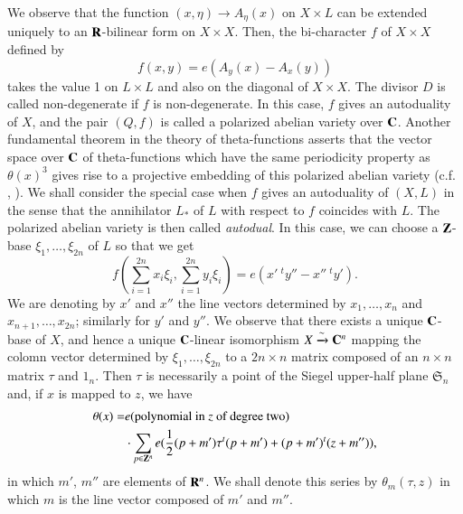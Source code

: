 We observe that the function $(x,\eta)\to A_{\eta}(x)$ on $X\times L$ can be extended uniquely to an $\mathbf{R}$-bilinear form on $X\times X$. Then, the bi-character $f$ of $X\times X$ defined by
$$
f(x,y)=e(A_{y}(x)-A_{x}(y))
$$\pageoriginale
takes the value 1 on $L\times L$ and also on the diagonal of $X\times X$. The divisor $D$ is called non-degenerate if $f$ is non-degenerate. In this case, $f$ gives an autoduality of $X$, and the pair $(Q,f)$ is called a polarized abelian variety over $\mathbf{C}$. Another fundamental theorem in the theory of theta-functions asserts that the vector space over $\mathbf{C}$ of theta-functions which have the same periodicity property as $\theta(x)^{3}$ gives rise to a projective embedding of this polarized abelian variety (c.f. \cite{art12-key23}, \cite{art12-key24}). We shall consider the special case when $f$ gives an autoduality of $(X,L)$ in the sense that the annihilator $L_{*}$ of $L$ with respect to $f$ coincides with $L$. The polarized abelian variety is then called {\em autodual}. In this case, we can choose a $\mathbf{Z}$-base $\xi_{1},\ldots,\xi_{2n}$  of $L$ so that we get
$$
f\left(\sum\limits^{2n}_{i=1}x_{i}\xi_{i},\sum\limits^{2n}_{i=1}y_{i}\xi_{i}\right)=e(x'\ {}^{t}y''-x'' \ {}^{t}y').
$$
We are denoting by $x'$ and $x''$ the line vectors determined by $x_{1},\ldots,x_{n}$ and $x_{n+1},\ldots,x_{2n}$; similarly for $y'$ and $y''$. We observe that there exists a unique $\mathbf{C}$-base of $X$, and hence a unique $\mathbf{C}$-linear isomorphism $X\xrightarrow{\sim}\mathbf{C}^{n}$ mapping the colomn vector determined by $\xi_{1},\ldots,\xi_{2n}$ to a $2n\times n$ matrix composed of an $n\times n$ matrix $\tau$ and $1_{n}$. Then $\tau$ is necessarily a point of the Siegel upper-half plane $\mathfrak{S}_{n}$ and, if $x$ is mapped to $z$, we have
\begin{align*}
\theta(x)= & e(\text{polynomial in $z$ of degree two})\\
           & \cdot \sum\limits_{p\in \mathbf{Z}^{n}}e(\frac{1}{2}(p+m')\tau^{t}(p+m')+(p+m')^{t}(z+m'')),
\end{align*}
in which $m'$, $m''$ are elements of $\mathbf{R}^{n}$. We shall denote this series by $\theta_{m}(\tau,z)$ in which $m$ is the line vector composed of $m'$ and $m''$.


